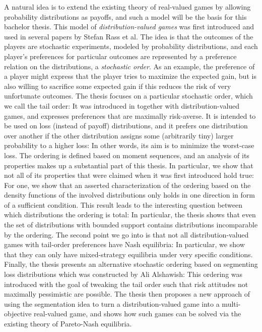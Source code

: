 \documentclass[a4paper,DIV=11]{scrreprt}
\theoremstyle{definition}
\begin{document}
    A natural idea is to extend the existing theory of real-valued games by allowing probability distributions as payoffs, and such a model will be the basis for this bachelor thesis. This model of \emph{distribution-valued games} was first introduced and used in several papers by Stefan Rass et al. The idea is that the outcomes of the players are stochastic experiments, modeled by probability distributions, and each player’s preferences for particular outcomes are represented by a preference relation on the distributions, a \emph{stochastic order}. As an example, the preference of a player might express that the player tries to maximize the expected gain, but is also willing to sacrifice some expected gain if this reduces the risk of very unfortunate outcomes.
    The thesis focuses on a particular stochastic order, which we call the tail order: It was introduced in \cite{bib:rassGameRiskManagI} together with distribution-valued games, and expresses preferences that are maximally risk-averse. It is intended to be used on loss (instead of payoff) distributions, and it prefers one distribution over another if the other distribution assigns some (arbitrarily tiny) larger probability to a higher loss: In other words, its aim is to minimize the worst-case loss. 
    The ordering is defined based on moment sequences, and an analysis of its properties makes up a substantial part of this thesis. In particular, we show that not all of its properties that were claimed when it was first introduced hold true: For one, we show that an asserted characterization of the ordering based on the density functions of the involved distributions only holds in one direction in form of a sufficient condition. This result leads to the interesting question between which distributions the ordering is total: In particular, the thesis shows that even the set of distributions with bounded support contains distributions incomparable by the ordering. The second point we go into is that not all distribution-valued games with tail-order preferences have Nash equilibria: In particular, we show that they can only have mixed-strategy equilibria under very specific conditions.
    Finally, the thesis presents an alternative stochastic ordering based on segmenting loss distributions which was constructed by Ali Alshawish: This ordering was introduced with the goal of tweaking the tail order such that risk attitudes not maximally pessimistic are possible. The thesis then proposes a new approach of using the segmentation idea to turn a distribution-valued game into a multi-objective real-valued game, and shows how such games can be solved via the existing theory of Pareto-Nash equilibria.
    
\end{document}
